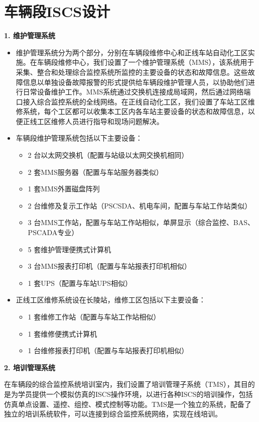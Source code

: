 \section{车辆段ISCS设计}
\textbf{1. 维护管理系统}

\begin{itemize}
	\item 维护管理系统分为两个部分，分别在车辆段维修中心和正线车站自动化工区实施。在车辆段维修中心，我们设置了一个维护管理系统（MMS），该系统用于采集、整合和处理综合监控系统所监控的主要设备的状态和故障信息。这些故障信息以单独设备故障报警的形式提供给车辆段维护管理人员，以协助他们进行日常设备维护工作。MMS系统通过交换机连接成局域网，然后通过网络端口接入综合监控系统的全线网络。在正线自动化工区，我们设置了车站工区维修系统，每个工区都可以收集本工区内各车站主要设备的状态和故障信息，以便正线工区维修人员进行指导和现场问题解决。
	
	\item 车辆段维护管理系统包括以下主要设备：
	\begin{itemize}
		\item 2 台以太网交换机（配置与站级以太网交换机相同）
		\item 2 套MMS服务器（配置与车站服务器类似）
		\item 1 套MMS外置磁盘阵列
		\item 2 台维修及复示工作站（PSCSDA、机电车间，配置与车站工作站类似）
		\item 3 台MMS工作站，配置与车站工作站相似，单屏显示（综合监控、BAS、PSCADA专业）
		\item 5 套维护管理便携式计算机
		\item 3 台MMS报表打印机（配置与车站报表打印机相似）
		\item 1 套UPS（配置与车站UPS相似）
	\end{itemize}
	
	\item 正线工区维修系统设在长陵站，维修工区包括以下主要设备：
	\begin{itemize}
		\item 1 套维修工作站（配置与车站工作站相似）
		\item 1 套维修便携式计算机
		\item 1 台维修报表打印机（配置与车站报表打印机相似）
	\end{itemize}
\end{itemize}

\textbf{2. 培训管理系统}

在车辆段的综合监控系统培训室内，我们设置了培训管理子系统（TMS），其目的是为学员提供一个模拟仿真的ISCS操作环境，以进行各种ISCS的培训操作，包括仿真单点设置、遥控、组控、模式控制等功能。TMS是一个独立的系统，配备了独立的培训系统软件，可以连接到综合监控系统网络，实现在线培训。

